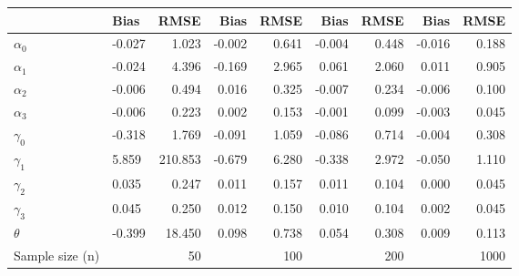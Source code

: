 
\begin{tabular}[t]{llrrrrrrr}
\toprule
  & Bias & RMSE & Bias & RMSE & Bias & RMSE & Bias & RMSE\\
\midrule
$\alpha_{0}$ & -0.027 & 1.023 & -0.002 & 0.641 & -0.004 & 0.448 & -0.016 & 0.188\\
$\alpha_{1}$ & -0.024 & 4.396 & -0.169 & 2.965 & 0.061 & 2.060 & 0.011 & 0.905\\
$\alpha_{2}$ & -0.006 & 0.494 & 0.016 & 0.325 & -0.007 & 0.234 & -0.006 & 0.100\\
$\alpha_{3}$ & -0.006 & 0.223 & 0.002 & 0.153 & -0.001 & 0.099 & -0.003 & 0.045\\
$\gamma_{0}$ & -0.318 & 1.769 & -0.091 & 1.059 & -0.086 & 0.714 & -0.004 & 0.308\\
$\gamma_{1}$ & 5.859 & 210.853 & -0.679 & 6.280 & -0.338 & 2.972 & -0.050 & 1.110\\
$\gamma_{2}$ & 0.035 & 0.247 & 0.011 & 0.157 & 0.011 & 0.104 & 0.000 & 0.045\\
$\gamma_{3}$ & 0.045 & 0.250 & 0.012 & 0.150 & 0.010 & 0.104 & 0.002 & 0.045\\
$\theta$ & -0.399 & 18.450 & 0.098 & 0.738 & 0.054 & 0.308 & 0.009 & 0.113\\
Sample size (n) &  & 50 &  & 100 &  & 200 &  & 1000\\
\bottomrule
\end{tabular}
